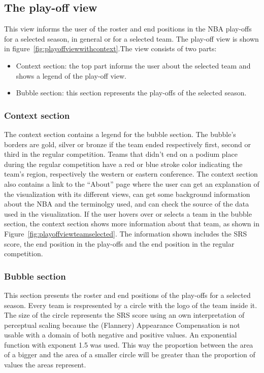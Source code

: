 \documentclass[chi_draft]{sigchi}
\begin{document}
\subsection{The play-off view}
This view informs the user of the roster and end positions in the NBA play-offs
for a selected season, in general or for a selected team. The play-off view is 
shown in figure~\ref{fig:playoffviewwithcontext}.The view consists of
two parts: 
\begin{itemize}
    \item Context section: the top part informs the user about the selected team
    and shows a legend of the play-off view.
    \item Bubble section: this section represents the play-offs of the selected
    season.
\end{itemize}

\subsubsection{Context section}
The context section contains a legend for the bubble section. The bubble's
borders are gold, silver or bronze if the team ended respectively first, second
or third in the regular competition. Teams that didn't end on a podium place
during the regular competition have a red or blue stroke color indicating the
team's region, respectively the western or eastern conference. The context
section also contains a link to the ``About'' page where the user can get an
explanation of the visualization with its different views, can get some
background information about the NBA and the terminolgy used, and can check the
source of the data used in the visualization. If the user hovers over or selects 
a team in the bubble section, the context section shows more information about that 
team, as shown in Figure~\ref{fig:playoffviewteamselected}. The information shown 
includes the SRS score, the end position in the play-offs and the end position in 
the regular competition.

\subsubsection{Bubble section}
This section presents the roster and end positions of the play-offs for a
selected season. Every team is respresented by a circle with the logo of the
team inside it. The size of the circle represents the SRS score using an own
interpretation of perceptual scaling because the (Flannery) Appearance
Compensation is not usable with a domain of both negative and positive values.
An exponential function with exponent 1.5 was used. This way the proportion
between the area of a bigger and the area of a smaller circle will be greater
than the proportion of values the areas represent.
\end{document}
